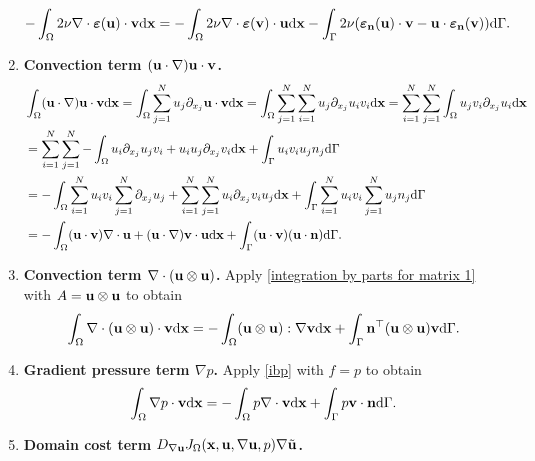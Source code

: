 \documentclass[oneside,11pt]{book}
\numberwithin{equation}{section}
\begin{document}
\begin{enumerate}[leftmargin=0mm]
\begin{align*}
        -\int_\Omega 2\nu\nabla\cdot\boldsymbol{\varepsilon}({\bf u})\cdot{\bf v}{\rm d}{\bf x} &= -\int_\Omega 2\nu\nabla\cdot\boldsymbol{\varepsilon}({\bf v})\cdot{\bf u}{\rm d}{\bf x} - \int_\Gamma 2\nu(\boldsymbol{\varepsilon}_{\bf n}({\bf u})\cdot{\bf v} - {\bf u}\cdot\boldsymbol{\varepsilon}_{\bf n}({\bf v})){\rm d}\Gamma.
    \end{align*}
    \item \textbf{Convection term $({\bf u}\cdot\nabla){\bf u}\cdot{\bf v}$.}
    \begin{align*}
        &\int_\Omega ({\bf u}\cdot\nabla){\bf u}\cdot{\bf v}{\rm d}{\bf x} = \int_\Omega \sum_{j=1}^N u_j\partial_{x_j}{\bf u}\cdot{\bf v}{\rm d}{\bf x} = \int_\Omega \sum_{j=1}^N\sum_{i=1}^N u_j\partial_{x_j}u_iv_i{\rm d}{\bf x} = \sum_{i=1}^N\sum_{j=1}^N \int_\Omega u_jv_i\partial_{x_j}u_i{\rm d}{\bf x}\\
        &= \sum_{i=1}^N\sum_{j=1}^N -\int_\Omega u_i\partial_{x_j}u_jv_i + u_iu_j\partial_{x_j}v_i{\rm d}{\bf x} + \int_\Gamma u_iv_iu_jn_j{\rm d}\Gamma\\
        &= -\int_\Omega \sum_{i=1}^N u_iv_i\sum_{j=1}^N \partial_{x_j}u_j + \sum_{i=1}^N\sum_{j=1}^N u_i\partial_{x_j}v_iu_j{\rm d}{\bf x} + \int_\Gamma \sum_{i=1}^N u_iv_i\sum_{j=1}^N u_jn_j{\rm d}\Gamma\\
        &= -\int_\Omega ({\bf u}\cdot{\bf v})\nabla\cdot{\bf u} + ({\bf u}\cdot\nabla){\bf v}\cdot{\bf u}{\rm d}{\bf x} + \int_\Gamma ({\bf u}\cdot{\bf v})({\bf u}\cdot{\bf n}){\rm d}\Gamma.
    \end{align*}
    \item \textbf{Convection term $\nabla\cdot({\bf u}\otimes{\bf u})$.} Apply \eqref{integration by parts for matrix 1} with $A = {\bf u}\otimes{\bf u}$ to obtain
    \begin{align*}
        \int_\Omega \nabla\cdot({\bf u}\otimes{\bf u})\cdot{\bf v}{\rm d}{\bf x} = -\int_\Omega ({\bf u}\otimes{\bf u}):\nabla{\bf v}{\rm d}{\bf x} + \int_\Gamma {\bf n}^\top({\bf u}\otimes{\bf u}){\bf v}{\rm d}\Gamma.
    \end{align*}
    \item \textbf{Gradient pressure term $\nabla p$.} Apply \eqref{ibp} with $f = p$ to obtain 
    \begin{align*}
        \int_\Omega \nabla p\cdot{\bf v}{\rm d}{\bf x} = -\int_\Omega p\nabla\cdot{\bf v}{\rm d}{\bf x} + \int_\Gamma p{\bf v}\cdot{\bf n}{\rm d}\Gamma.
    \end{align*}
    \item \textbf{Domain cost term $D_{\nabla{\bf u}}J_\Omega({\bf x},{\bf u},\nabla{\bf u},p)\nabla\tilde{\bf u}$.}

\end{enumerate}
\end{document}
